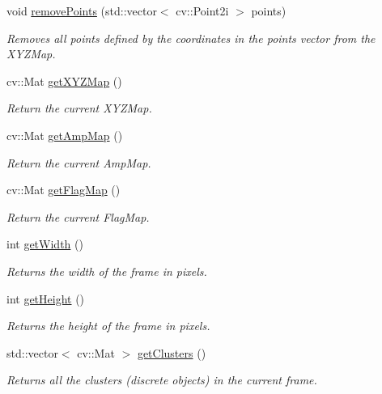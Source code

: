 \begin{DoxyCompactItemize}
void \hyperlink{class_depth_camera_a8f38ced63dcfb0c4c56cb7d4e940bcd8}{remove\+Points} (std\+::vector$<$ cv\+::\+Point2i $>$ points)
\begin{DoxyCompactList}\small\item\em Removes all points defined by the coordinates in the points vector from the X\+Y\+Z\+Map. \end{DoxyCompactList}\item 
cv\+::\+Mat \hyperlink{class_depth_camera_a0c295c5a0696550f453b1c8cd0fcb188}{get\+X\+Y\+Z\+Map} ()
\begin{DoxyCompactList}\small\item\em Return the current X\+Y\+Z\+Map. \end{DoxyCompactList}\item 
cv\+::\+Mat \hyperlink{class_depth_camera_a8211704726722a1be3d9b2aeeeffcf09}{get\+Amp\+Map} ()
\begin{DoxyCompactList}\small\item\em Return the current Amp\+Map. \end{DoxyCompactList}\item 
cv\+::\+Mat \hyperlink{class_depth_camera_a348cd41559a416a61780073f5369b032}{get\+Flag\+Map} ()
\begin{DoxyCompactList}\small\item\em Return the current Flag\+Map. \end{DoxyCompactList}\item 
int \hyperlink{class_depth_camera_a59fa917e64c6c67248787ba2cba3654b}{get\+Width} ()
\begin{DoxyCompactList}\small\item\em Returns the width of the frame in pixels. \end{DoxyCompactList}\item 
int \hyperlink{class_depth_camera_a430070d82a2bfc2583fd8290ca7bb8d6}{get\+Height} ()
\begin{DoxyCompactList}\small\item\em Returns the height of the frame in pixels. \end{DoxyCompactList}\item 
std\+::vector$<$ cv\+::\+Mat $>$ \hyperlink{class_depth_camera_a18d88b8df2a08c9c167207fea587d66e}{get\+Clusters} ()
\begin{DoxyCompactList}\small\item\em Returns all the clusters (discrete objects) in the current frame. \end{DoxyCompactList}\end{DoxyCompactItemize}
